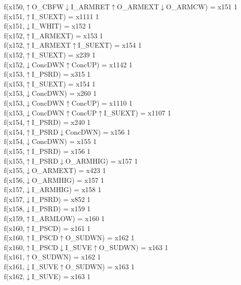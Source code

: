 f(x150,$\uparrow$O\_CBFW$\downarrow$I\_ARMRET$\uparrow$O\_ARMEXT$\downarrow$O\_ARMCW) = x151 {1} \\
f(x151,$\uparrow$I\_SUEXT) = x1111 {1} \\
f(x151,$\downarrow$I\_WHIT) = x152 {1} \\
f(x152,$\uparrow$I\_ARMEXT) = x153 {1} \\
f(x152,$\uparrow$I\_ARMEXT$\uparrow$I\_SUEXT) = x154 {1} \\
f(x152,$\uparrow$I\_SUEXT) = x239 {1} \\
f(x152,$\downarrow$ConcDWN$\uparrow$ConcUP) = x1142 {1} \\
f(x153,$\uparrow$I\_PSRD) = x315 {1} \\
f(x153,$\uparrow$I\_SUEXT) = x154 {1} \\
f(x153,$\downarrow$ConcDWN) = x260 {1} \\
f(x153,$\downarrow$ConcDWN$\uparrow$ConcUP) = x1110 {1} \\
f(x153,$\downarrow$ConcDWN$\uparrow$ConcUP$\uparrow$I\_SUEXT) = x1107 {1} \\
f(x154,$\uparrow$I\_PSRD) = x240 {1} \\
f(x154,$\uparrow$I\_PSRD$\downarrow$ConcDWN) = x156 {1} \\
f(x154,$\downarrow$ConcDWN) = x155 {1} \\
f(x155,$\uparrow$I\_PSRD) = x156 {1} \\
f(x155,$\uparrow$I\_PSRD$\downarrow$O\_ARMHIG) = x157 {1} \\
f(x155,$\downarrow$O\_ARMEXT) = x423 {1} \\
f(x156,$\downarrow$O\_ARMHIG) = x157 {1} \\
f(x157,$\downarrow$I\_ARMHIG) = x158 {1} \\
f(x157,$\downarrow$I\_PSRD) = x852 {1} \\
f(x158,$\downarrow$I\_PSRD) = x159 {1} \\
f(x159,$\uparrow$I\_ARMLOW) = x160 {1} \\
f(x160,$\uparrow$I\_PSCD) = x161 {1} \\
f(x160,$\uparrow$I\_PSCD$\uparrow$O\_SUDWN) = x162 {1} \\
f(x160,$\uparrow$I\_PSCD$\downarrow$I\_SUVE$\uparrow$O\_SUDWN) = x163 {1} \\
f(x161,$\uparrow$O\_SUDWN) = x162 {1} \\
f(x161,$\downarrow$I\_SUVE$\uparrow$O\_SUDWN) = x163 {1} \\
f(x162,$\downarrow$I\_SUVE) = x163 {1} \\
